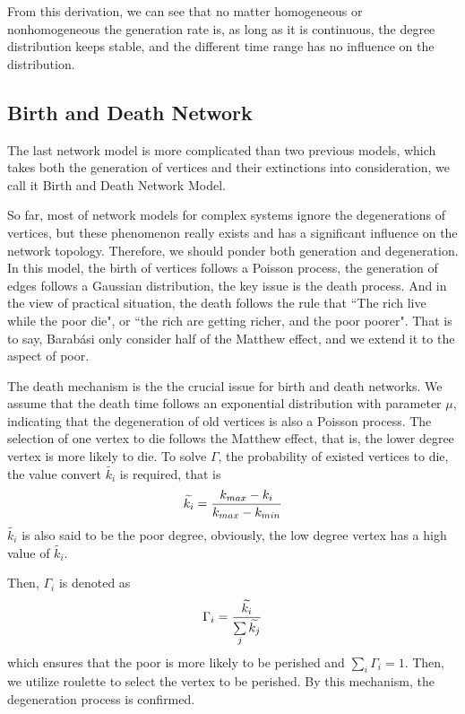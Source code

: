 \documentclass[final]{IEEEtran}
\begin{document}
From this derivation, we can see that no matter homogeneous or
nonhomogeneous the generation rate is, as long as it is
continuous, the degree distribution keeps stable, and the
different time range has no influence on the distribution.



\subsection{Birth and Death Network}

The last network model is more complicated than two previous
models, which takes both the generation of vertices and their
extinctions into consideration, we call it Birth and Death Network
Model.

So far, most of network models for complex systems ignore the
degenerations of vertices, but these phenomenon really exists and
has a significant influence on the network topology. Therefore, we
should ponder both generation and degeneration. In this model, the
birth of vertices follows a Poisson process, the generation of
edges follows a Gaussian distribution, the key issue is the death
process. And in the view of practical situation, the death follows
the rule that ``The rich live while the poor die", or ``the rich
are getting richer, and the poor poorer". That is to say,
Barab\'{a}si only consider half of the Matthew effect, and we
extend it to the aspect of poor.

The death mechanism is the the crucial issue for birth and death
networks. We assume that the death time follows an exponential
distribution with parameter $\mu$, indicating that the
degeneration of old vertices is also a Poisson process. The
selection of one vertex to die follows the Matthew effect, that
is, the lower degree vertex is more likely to die. To solve
$\Gamma$, the probability of existed vertices to die, the value
convert $\widetilde{k_{i}}$ is required, that is
\begin{equation}\footnotesize
\widetilde{k_{i}}=\frac{k_{max}-k_{i}}{k_{max}-k_{min}}
\end{equation}
$\widetilde{k_{i}}$ is also said to be the poor degree, obviously,
the low degree vertex has a high value of $\widetilde{k_{i}}$.

Then, $\Gamma_{i}$ is denoted as
\begin{equation}\footnotesize
\Gamma_{i}=\frac{\widetilde{k_{i}}}{\sum
\limits_{j}\widetilde{k_{j}}}
\end{equation}
which ensures that the poor is more likely to be perished and
$\sum\limits_{i}\Gamma_{i}=1$. Then, we utilize roulette to select
the vertex to be perished. By this mechanism, the degeneration
process is confirmed.
\end{document}
